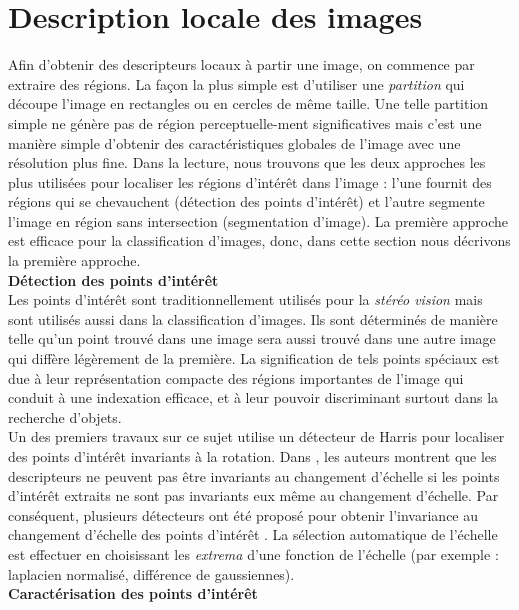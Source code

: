 \section{Description locale des images}
Afin d'obtenir des descripteurs locaux à partir une image, on commence par extraire des régions. La façon la plus simple est d'utiliser une \textit{partition} qui découpe l'image en rectangles ou en cercles de même taille. Une telle partition simple ne génère pas de région perceptuelle-ment significatives mais c'est une manière simple d'obtenir des caractéristiques globales de l'image avec une résolution plus fine. Dans la lecture, nous trouvons que les deux approches les plus utilisées pour localiser les régions d'intérêt dans l'image : l'une fournit des régions qui se chevauchent (détection des points d'intérêt) et l'autre segmente l'image en région sans intersection (segmentation d'image)\cite{khang09}. La première approche est efficace pour la classification d'images, donc, dans cette section nous décrivons la première approche.\\[0.5cm]
\textbf{Détection des points d'intérêt}\\

Les points d'intérêt sont traditionnellement utilisés pour la \textit{stéréo vision} mais sont utilisés aussi dans la classification d'images. Ils sont déterminés de manière telle qu'un point trouvé dans une image sera aussi trouvé dans une autre image qui diffère légèrement de la première. La signification de tels points spéciaux est due à leur représentation compacte des régions importantes de l'image qui conduit à une indexation efficace, et à leur pouvoir discriminant surtout dans la recherche d'objets.\\

Un des premiers travaux sur ce sujet \cite{sm97} utilise un détecteur de Harris \cite{hs88} pour localiser des points d'intérêt invariants à la rotation. Dans \cite{dsh00}, les auteurs montrent que les descripteurs ne peuvent pas être invariants au changement d'échelle si les points d'intérêt extraits ne sont pas invariants eux même au changement d'échelle. Par conséquent, plusieurs détecteurs ont été proposé pour obtenir l'invariance au changement d'échelle des points d'intérêt \cite{lin98, low99, ms01, low04}. La sélection automatique de l'échelle est effectuer en choisissant les \textit{extrema} d'une fonction de l'échelle (par exemple : laplacien normalisé, différence de gaussiennes).\\[0.5cm]
\textbf{Caractérisation des points d'intérêt}\\

